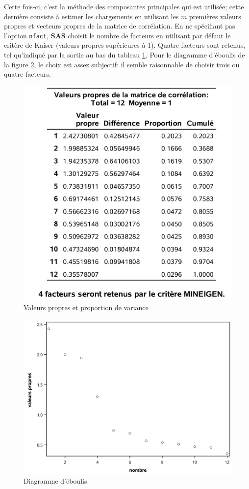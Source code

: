 \documentclass[
  11pt,
  letterpaper,
]{book}
\theoremstyle{definition}
\theoremstyle{definition}
\theoremstyle{definition}
\theoremstyle{definition}
\theoremstyle{remark}
\begin{document}
Cette fois-ci, c'est la méthode des composantes principales qui est utilisée; cette dernière consiste à estimer les chargements en utilisant les \(m\) premières valeurs propres et vecteurs propres de la matrice de corrélation. En ne spécifiant pas l'option \texttt{nfact}, \textbf{SAS} choisit le nombre de facteurs en utilisant par défaut le critère de Kaiser (valeurs propres supérieures à 1). Quatre facteurs sont retenus, tel qu'indiqué par la sortie au bas du tableau \ref{fig:fig1p7}. Pour le diagramme d'éboulis de la figure \ref{fig:fig1p6}, le choix est assez subjectif: il semble raisonnable de choisir trois ou quatre facteurs.

\begin{figure}

{\centering \includegraphics[width=0.65\linewidth]{figures/01-facto-e7} 

}

\caption{Valeurs propres et proportion de variance}\label{fig:fig1p7}
\end{figure}

\begin{figure}

{\centering \includegraphics[width=0.65\linewidth]{figures/01-facto-e6} 

}

\caption{Diagramme d'éboulis}\label{fig:fig1p6}
\end{figure}
\end{document}
